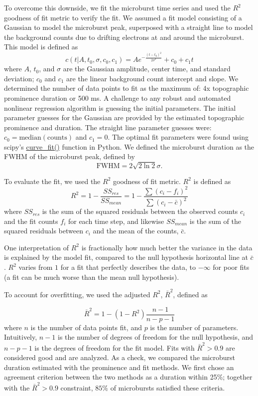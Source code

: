 \documentclass[draft]{agujournal2019}
\begin{document}
To overcome this downside, we fit the microburst time series and used the $R^2$ goodness of fit metric to verify the fit. We assumed a fit model consisting of a Gaussian to model the microburst peak, superposed with a straight line to model the background counts due to drifting electrons at and around the microburst. This model is defined as
\begin{equation}
c(t | A, t_0, \sigma, c_0, c_1) = A e^{-\frac{(t-t_0)^2}{2\sigma^2}} + c_0 + c_1 t
\end{equation} where $A$, $t_0$, and $\sigma$ are the Gaussian amplitude, center time, and standard deviation; $c_0$ and $c_1$ are the linear background count intercept and slope. We determined the number of data points to fit as the maximum of: 4x topographic prominence duration or 500 ms. A challenge to any robust and automated nonlinear regression algorithm is guessing the initial parameters. The initial parameter guesses for the Gaussian are provided by the estimated topographic prominence and duration. The straight line parameter guesses were: $c_0=\mathrm{median(counts)}$ and $c_1=0$. The optimal fit parameters were found using scipy's \url{curve_fit()} function in Python. We defined the microburst duration as the FWHM of the microburst peak, defined by
\begin{equation}
\mathrm{FWHM} = 2\sqrt{2 \ln{2}} \sigma.
\end{equation}

To evaluate the fit, we used the $R^2$ goodness of fit metric. $R^2$ is defined as
\begin{equation}
R^2 = 1 - \frac{SS_{res}}{SS_{mean}} = 1 - \frac{\sum{(c_i-f_i)^2}}{\sum{(c_i-\bar{c})^2}}
\end{equation} where $SS_{res}$ is the sum of the squared residuals between the observed counts $c_i$ and the fit counts $f_i$ for each time step, and likewise $SS_{mean}$ is the sum of the squared residuals between $c_i$ and the mean of the counts, $\bar{c}$.

One interpretation of $R^2$ is fractionally how much better the variance in the data is explained by the model fit, compared to the null hypothesis horizontal line at $\bar{c}$. $R^2$ varies from $1$ for a fit that perfectly describes the data, to $-\infty$ for poor fits (a fit can be much worse than the mean null hypothesis).

To account for overfitting, we used the adjusted $R^2$, $\bar{R}^2$, defined as

\begin{equation}
\bar{R}^2 = 1 - (1-R^2) \frac{n-1}{n-p-1}
\end{equation} where $n$ is the number of data points fit, and $p$ is the number of parameters. Intuitively, $n-1$ is the number of degrees of freedom for the null hypothesis, and $n-p-1$ is the degrees of freedom for the fit model. Fits with $\bar{R}^2 > 0.9$ are considered good and are analyzed. As a check, we compared the microburst duration estimated with the prominence and fit methods. We first chose an agreement criterion between the two methods as a duration within 25\%; together with the $\bar{R}^2 > 0.9$ constraint, $85\%$ of microbursts satisfied these criteria.
\end{document}

